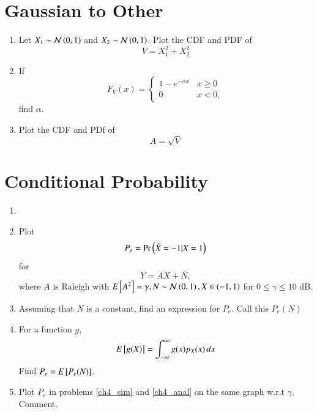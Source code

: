 \documentclass[journal,12pt,twocolumn]{IEEEtran}
\renewcommand\thesection{\arabic{section}}
\begin{document}
\section{Gaussian to Other}
\begin{enumerate}[label=\thesection.\arabic*
        ,ref=\thesection.\theenumi]
    \item
          Let $X_1 \sim  \mathcal{N}\left(0,1\right)$ and $X_2 \sim  \mathcal{N}\left(0,1\right)$. Plot the CDF and PDF of
          \begin{equation}
              V = X_1^2 + X_2^2
          \end{equation}
    \item
          If
          \begin{equation}
              F_{V}(x) =
              \begin{cases}
                  1 - e^{-\alpha x} & x \geq 0 \\
                  0                 & x < 0,
              \end{cases}
          \end{equation}
          find $\alpha$.
    \item
          \label{ch3_raleigh_sim}
          Plot the CDF and PDf of
          \begin{equation}
              A = \sqrt{V}
          \end{equation}
\end{enumerate}
\section{Conditional Probability}
\begin{enumerate}[label=\thesection.\arabic*
        ,ref=\thesection.\theenumi]
    \item
    \item
          \label{ch4_sim}
          Plot
          \begin{equation}
              P_e = \Pr\left(\hat{X} = -1|X=1\right)
          \end{equation}
          for
          \begin{equation}
              Y = AX+N,
          \end{equation}
          where $A$ is Raleigh with $E{}\left[A^2\right] = \gamma, N \sim \mathcal{N}\left(0,1\right), X \in \left(-1,1\right)$ for $0 \le \gamma \le 10$ dB.
    \item
          Assuming that $N$ is a constant, find an expression for $P_e$.  Call this $P_e(N)$
    \item
          \label{ch4_anal}
          For a function $g$,
          \begin{equation}
              E{}\left[g(X)\right] = \int_{-\infty}^{\infty}g(x)p_{X}(x)\, dx
          \end{equation}
          Find $P_e = E{}\left[P_e(N)\right]$.
    \item
          Plot $P_e$ in problems \ref{ch4_sim} and \ref{ch4_anal} on the same graph w.r.t $\gamma$.  Comment.
\end{enumerate}
\end{document}
